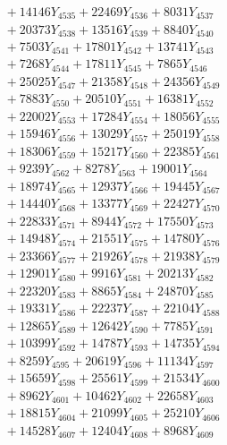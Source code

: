 \documentclass[a4paper,10pt]{article}
\begin{document}
{\begin{align}
&\;  + 14146 Y_{4535} + 22469 Y_{4536} + 8031 Y_{4537} \\[0.3ex]
&\;  + 20373 Y_{4538} + 13516 Y_{4539} + 8840 Y_{4540} \\[0.3ex]
&\;  + 7503 Y_{4541} + 17801 Y_{4542} + 13741 Y_{4543} \\[0.3ex]
&\;  + 7268 Y_{4544} + 17811 Y_{4545} + 7865 Y_{4546} \\[0.3ex]
&\;  + 25025 Y_{4547} + 21358 Y_{4548} + 24356 Y_{4549} \\[0.3ex]
&\;  + 7883 Y_{4550} + 20510 Y_{4551} + 16381 Y_{4552} \\[0.3ex]
&\;  + 22002 Y_{4553} + 17284 Y_{4554} + 18056 Y_{4555} \\[0.3ex]
&\;  + 15946 Y_{4556} + 13029 Y_{4557} + 25019 Y_{4558} \\[0.5ex]\allowbreak
&\;  + 18306 Y_{4559} + 15217 Y_{4560} + 22385 Y_{4561} \\[0.3ex]
&\;  + 9239 Y_{4562} + 8278 Y_{4563} + 19001 Y_{4564} \\[0.3ex]
&\;  + 18974 Y_{4565} + 12937 Y_{4566} + 19445 Y_{4567} \\[0.3ex]
&\;  + 14440 Y_{4568} + 13377 Y_{4569} + 22427 Y_{4570} \\[0.3ex]
&\;  + 22833 Y_{4571} + 8944 Y_{4572} + 17550 Y_{4573} \\[0.3ex]
&\;  + 14948 Y_{4574} + 21551 Y_{4575} + 14780 Y_{4576} \\[0.3ex]
&\;  + 23366 Y_{4577} + 21926 Y_{4578} + 21938 Y_{4579} \\[0.3ex]
&\;  + 12901 Y_{4580} + 9916 Y_{4581} + 20213 Y_{4582} \\[0.3ex]
&\;  + 22320 Y_{4583} + 8865 Y_{4584} + 24870 Y_{4585} \\[0.3ex]
&\;  + 19331 Y_{4586} + 22237 Y_{4587} + 22104 Y_{4588} \\[0.5ex]\allowbreak
&\;  + 12865 Y_{4589} + 12642 Y_{4590} + 7785 Y_{4591} \\[0.3ex]
&\;  + 10399 Y_{4592} + 14787 Y_{4593} + 14735 Y_{4594} \\[0.3ex]
&\;  + 8259 Y_{4595} + 20619 Y_{4596} + 11134 Y_{4597} \\[0.3ex]
&\;  + 15659 Y_{4598} + 25561 Y_{4599} + 21534 Y_{4600} \\[0.3ex]
&\;  + 8962 Y_{4601} + 10462 Y_{4602} + 22658 Y_{4603} \\[0.3ex]
&\;  + 18815 Y_{4604} + 21099 Y_{4605} + 25210 Y_{4606} \\[0.3ex]
&\;  + 14528 Y_{4607} + 12404 Y_{4608} + 8968 Y_{4609} \\[0.3ex]

\end{align}}
\end{document}
